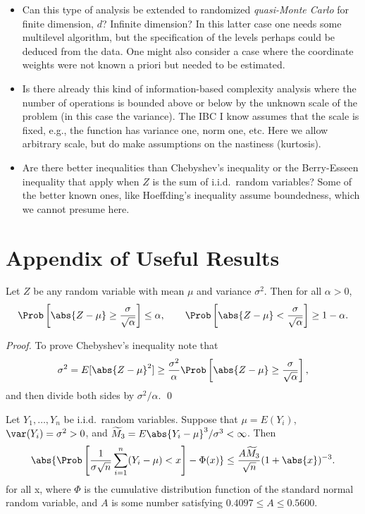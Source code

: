 \documentclass[graybox]{svmult}
\begin{document}
\begin{itemize}

\item Can this type of analysis be extended to randomized \emph{quasi-Monte Carlo} for finite dimension, $d$?  Infinite dimension?  In this latter case one needs some multilevel algorithm, but the specification of the levels perhaps could be deduced from the data.  One might also consider a case where the coordinate weights were not known a priori but needed to be estimated.

\item Is there already this kind of information-based complexity analysis where the number of operations is bounded above or below by the unknown scale of the problem (in this case the variance).  The IBC I know assumes that the scale is fixed, e.g., the function has variance one, norm one, etc.  Here we allow arbitrary scale, but do make assumptions on the nastiness (kurtosis).

\item Are there better inequalities than Chebyshev's inequality or the Berry-Esseen inequality that apply when $Z$ is the sum of i.i.d.\ random variables?  Some of the better known ones, like Hoeffding's inequality assume boundedness, which we cannot presume here.

\end{itemize}

\section{Appendix of Useful Results}
\begin{theorem} \label{Chebineqthm} Let $Z$ be any random variable with mean $\mu$ and variance $\sigma^2$.  Then for all $\alpha >0$,
\[
\Prob\left[\abs{Z-\mu} \ge \frac{\sigma}{\sqrt{\alpha}} \right] \le \alpha, \qquad \Prob\left[\abs{Z-\mu} < \frac{\sigma}{\sqrt{\alpha}} \right] \ge 1-\alpha.
\]
\end{theorem}
\begin{proof}To prove Chebyshev's inequality note that
\begin{equation*}
\sigma^2 = E[\abs{Z-\mu}^2] \ge \frac{\sigma^2}{\alpha} \Prob\left[\abs{Z-\mu} \ge \frac{\sigma}{\sqrt{\alpha}} \right],
\end{equation*}
and then divide both sides by $\sigma^2/\alpha$. \qed
\end{proof}
\begin{theorem} \cite[Theorem 5.16, p. 168]{Pet95a} \label{BE} Let $Y_1,\dots,Y_n$ be i.i.d.\ random variables.  Suppose that
$\mu=E(Y_i)$, $\var(Y_i)=\sigma^2>0$,  and $\widetilde{M}_3=E\abs{Y_i - \mu}^3/\sigma^3 < \infty$.
Then
\[
\abs{\Prob\left[\frac{1}{\sigma\sqrt{n}}\sum_{i=1}^{n}(Y_i-\mu)<x
\right]-\Phi(x)}\leq \frac{A \widetilde{M}_3}{\sqrt{n}}(1+\abs{x})^{-3}.
\] for all x,
where $\Phi$ is the cumulative distribution function of the standard normal random variable, and $A$ is some number satisfying $0.4097\leq A\leq 0.5600$.
\end{theorem}
\end{document}
